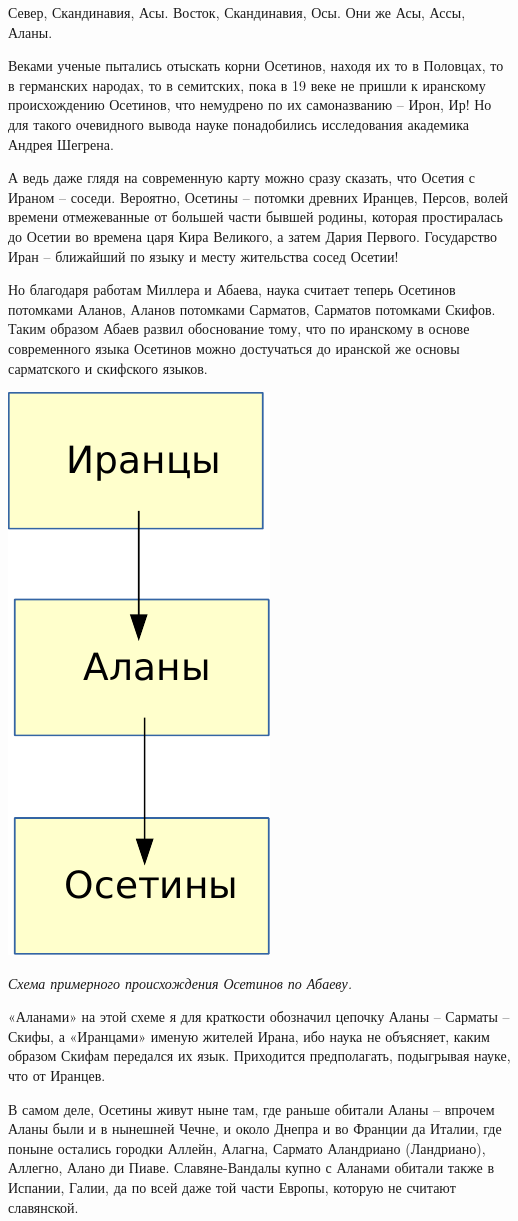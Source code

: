 Север, Скандинавия, Асы. Восток, Скандинавия, Осы. Они же Асы, Ассы, Аланы.

Веками ученые пытались отыскать корни Осетинов, находя их то в Половцах, то в германских народах, то в семитских, пока в 19 веке не пришли к иранскому происхождению Осетинов, что немудрено по их самоназванию – Ирон, Ир! Но для такого очевидного вывода науке понадобились исследования академика Андрея Шегрена.

А ведь даже глядя на современную карту можно сразу сказать, что Осетия с Ираном – соседи. Вероятно, Осетины – потомки древних Иранцев, Персов, волей времени отмежеванные от большей части бывшей родины, которая простиралась до Осетии во времена царя Кира Великого, а затем Дария Первого. Государство Иран – ближайший по языку и месту жительства сосед Осетии!

Но благодаря работам Миллера и Абаева, наука считает теперь Осетинов потомками Аланов, Аланов потомками Сарматов, Сарматов потомками Скифов. Таким образом Абаев развил обоснование тому, что по иранскому в основе современного языка Осетинов можно достучаться до иранской же основы сарматского и скифского языков.

\begin{center}
\includegraphics[width=0.20\linewidth]{chast-colebanie-osnov/okartah/iron02.pdf}

\textit{Схема примерного происхождения Осетинов по Абаеву.}
\end{center}

«Аланами» на этой схеме я для краткости обозначил цепочку Аланы – Сарматы – Скифы, а «Иранцами» именую жителей Ирана, ибо наука не объясняет, каким образом Скифам передался их язык. Приходится предполагать, подыгрывая науке, что от Иранцев.

В самом деле, Осетины живут ныне там, где раньше обитали Аланы – впрочем Аланы были и в нынешней Чечне, и около Днепра и во Франции да Италии, где поныне остались городки Аллейн, Алагна, Сармато Аландриано (Ландриано), Аллегно, Алано ди Пиаве. Славяне-Вандалы купно с Аланами обитали также в Испании, Галии, да по всей даже той части Европы, которую не считают славянской.

